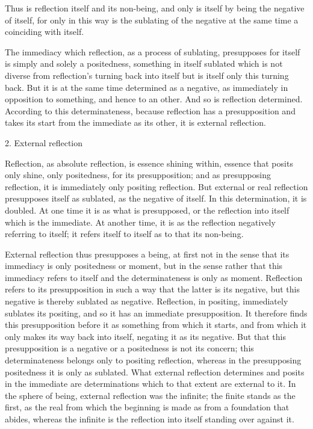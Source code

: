 Thus is reflection itself and its non-being,
and only is itself by being the negative of itself,
for only in this way is the sublating of the negative
at the same time a coinciding with itself.

The immediacy which reflection, as a process of sublating,
presupposes for itself is simply and solely a positedness,
something in itself sublated which is not diverse from
reflection's turning back into itself
but is itself only this turning back.
But it is at the same time determined as a negative,
as immediately in opposition to something,
and hence to an other.
And so is reflection determined.
According to this determinateness,
because reflection has a presupposition
and takes its start from the immediate as its other,
it is external reflection.

2. External reflection

Reflection, as absolute reflection, is essence shining within,
essence that posits only shine, only positedness, for its presupposition;
and as presupposing reflection, it is immediately only positing reflection.
But external or real reflection presupposes itself as sublated,
as the negative of itself.
In this determination, it is doubled.
At one time it is as what is presupposed,
or the reflection into itself which is the immediate.
At another time, it is as the reflection
negatively referring to itself;
it refers itself to itself as
to that its non-being.

External reflection thus presupposes a being,
at first not in the sense that
its immediacy is only positedness or moment,
but in the sense rather that
this immediacy refers to itself
and the determinateness is only as moment.
Reflection refers to its presupposition in such a way
that the latter is its negative,
but this negative is thereby sublated as negative.
Reflection, in positing, immediately sublates its positing,
and so it has an immediate presupposition.
It therefore finds this presupposition before it
as something from which it starts,
and from which it only makes its way back into itself,
negating it as its negative.
But that this presupposition is a negative
or a positedness is not its concern;
this determinateness belongs only to positing reflection,
whereas in the presupposing positedness
it is only as sublated.
What external reflection determines and posits in the immediate
are determinations which to that extent are external to it.
In the sphere of being, external reflection was the infinite;
the finite stands as the first,
as the real from which the beginning is made
as from a foundation that abides,
whereas the infinite is the reflection into itself
standing over against it.

